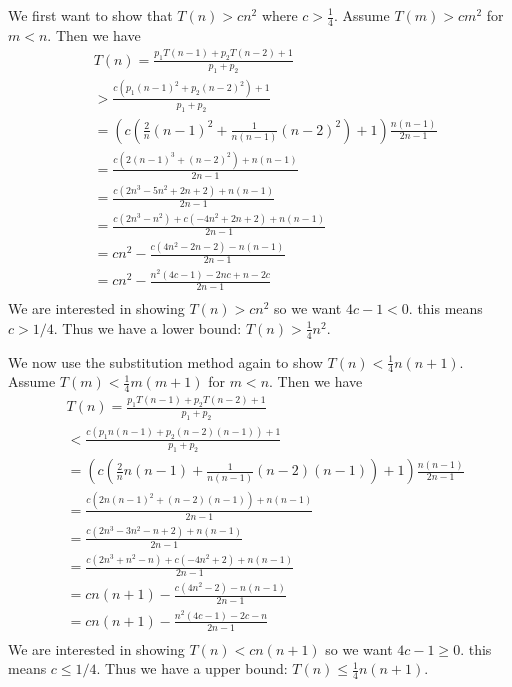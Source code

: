 \documentclass{article}
\begin{document}
We first want to show that $T(n) > cn^2$ where $c > \frac{1}{4}$. Assume $T(m) > cm^2$ for $m < n$.
Then we have
\begin{align}
    & T(n) = \frac{p_1T(n - 1) + p_2T(n - 2) + 1}{p_1 + p_2} \\\nonumber
    &  > \frac{c(p_1(n - 1)^2 + p_2(n - 2)^2) + 1}{p_1 + p_2} \\\nonumber
    &=  {(c(\frac{2}{n}(n - 1)^2 + \frac{1}{n(n-1)}(n - 2)^2) + 1)}{\frac{n(n - 1)}{2n - 1}} \\\nonumber
    &=  \frac{c(2(n - 1)^3 + (n - 2)^2) + n(n-1)}{2n - 1} \\\nonumber
    &=  \frac{c(2n^3 - 5n^2 + 2n + 2) + n(n-1)}{2n - 1} \\\nonumber
    &=  \frac{c(2n^3 - n^2) + c(-4n^2 + 2n + 2) + n(n-1)}{2n - 1} \\\nonumber
    &=  cn^2 - \frac{c(4n^2 - 2n - 2) - n(n-1)}{2n - 1} \\\nonumber
    &=  cn^2 - \frac{n^2(4c - 1) - 2nc + n - 2c}{2n - 1} \\\nonumber
\end{align}
We are interested in showing $T(n) > cn^2$ so we want $4c - 1 < 0$. this means $c > 1/4$.
Thus we have a lower bound: $T(n) > \frac{1}{4}n^2$.

We now use the substitution method again to show $T(n) < \frac{1}{4}n(n + 1)$. Assume
$T(m) < \frac{1}{4}m(m+1)$ for $m < n$. Then we have
\begin{align}
    & T(n) = \frac{p_1T(n - 1) + p_2T(n - 2) + 1}{p_1 + p_2} \\\nonumber
    &  < \frac{c(p_1n(n - 1) + p_2(n - 2)(n - 1)) + 1}{p_1 + p_2} \\\nonumber
    &=  {(c(\frac{2}{n}n(n - 1) + \frac{1}{n(n-1)}(n - 2)(n-1)) + 1)}{\frac{n(n - 1)}{2n - 1}} \\\nonumber
    &=  \frac{c(2n(n - 1)^2 + (n - 2)(n - 1)) + n(n-1)}{2n - 1} \\\nonumber
    &=  \frac{c(2n^3 - 3n^2 - n + 2) + n(n-1)}{2n - 1} \\\nonumber
    &=  \frac{c(2n^3 + n^2 - n) + c(-4n^2 + 2) + n(n-1)}{2n - 1} \\\nonumber
    &=  cn(n + 1) - \frac{c(4n^2 - 2) - n(n-1)}{2n - 1} \\\nonumber
    &=  cn(n +1) - \frac{n^2(4c - 1) - 2c - n}{2n - 1} \\\nonumber
\end{align}
We are interested in showing $T(n) < cn(n + 1)$ so we want $4c - 1 \geq 0$. this means $c \leq 1/4$.
Thus we have a upper bound: $T(n) \leq \frac{1}{4}n(n + 1)$.
\end{document}
